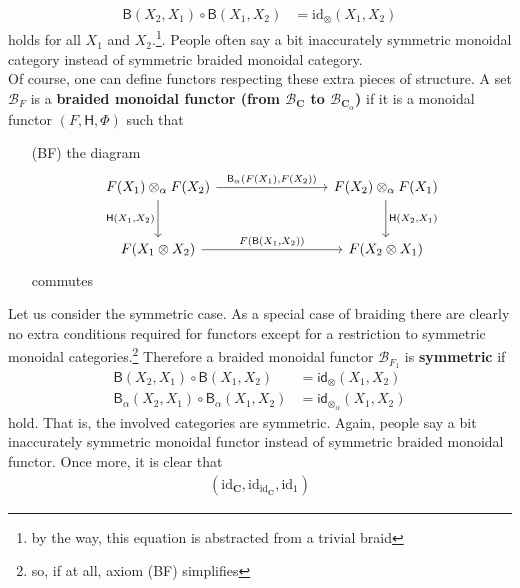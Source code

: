 \begin{align*}
  \mathsf{B}(X_{2},X_{1})
  \circ
  \mathsf{B}(X_{1},X_{2})
  &=
  \mathrm{id}_{\otimes}(X_{1},X_{2})
\end{align*}
holds for all $X_{1}$ and $X_{2}$.\footnote{by the way, this equation is abstracted from a trivial braid}. People often say a bit inaccurately {\glqq}symmetric monoidal category{\grqq} instead of {\glqq}symmetric braided monoidal category{\grqq}.
\\
Of course, one can define functors respecting these extra pieces of structure. A set $\mathcal{B}_{F}$ is a \textbf{braided monoidal functor (from $\mathcal{B}_{\mathbf{C}}$ to $\mathcal{B}_{\mathbf{C}_{\alpha}}$)} if it is a monoidal functor $(F,\mathsf{H},\Phi)$ such that
\begin{enumerate}
\item[(BF)]
the diagram
\[
\begin{tikzcd}[row sep=large,column sep=8em]
  F(X_{1})
  \otimes_{\alpha}
  F(X_{2})
  \arrow{r}{\mathsf{B}_{\alpha}(F(X_{1}),F(X_{2}))}
  \arrow[swap]{d}{\mathsf{H}(X_{1},X_{2})}
  &
  F(X_{2})
  \otimes_{\alpha}
  F(X_{1})
  \arrow{d}{\mathsf{H}(X_{2},X_{1})}
  \\
  F(X_{1} \otimes X_{2})
  \arrow{r}{F(\mathsf{B}(X_{1},X_{2}))}
  &
  F(X_{2} \otimes X_{1})
\end{tikzcd}
\]
commutes
\end{enumerate}
Let us consider the symmetric case. As a special case of braiding there are clearly no extra conditions required for functors except for a restriction to symmetric monoidal categories.\footnote{so, if at all, axiom (BF) simplifies} Therefore a braided monoidal functor $\mathcal{B}_{F_{1}}$ is \textbf{symmetric} if
\begin{align*}
  \mathsf{B}(X_{2},X_{1})
  \circ
  \mathsf{B}(X_{1},X_{2})
  &=
  \mathsf{id}_{\otimes}(X_{1},X_{2})
  \\
  \mathsf{B_{\alpha}}(X_{2},X_{1})
  \circ
  \mathsf{B_{\alpha}}(X_{1},X_{2})
  &=
  \mathsf{id}_{\otimes_{\alpha}}(X_{1},X_{2})
\end{align*}
hold. That is, the involved categories are symmetric. Again, people say a bit inaccurately {\glqq}symmetric monoidal functor{\grqq} instead of {\glqq}symmetric braided monoidal functor{\grqq}. Once more, it is clear that
\begin{align*}
  \left(
    \mathrm{id}_{\mathbf{C}},
    \mathrm{id}_{\mathrm{id}_{\mathbf{C}}},
    \mathrm{id}_{1}
  \right)
\end{align*}

